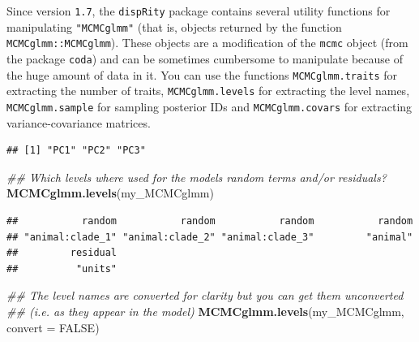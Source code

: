 \documentclass[
]{book}
\newenvironment{Shaded}{\begin{snugshade}}{\end{snugshade}}
\newcommand{\CommentTok}[1]{\textcolor[rgb]{0.56,0.35,0.01}{\textit{#1}}}
\newcommand{\DataTypeTok}[1]{\textcolor[rgb]{0.13,0.29,0.53}{#1}}
\newcommand{\KeywordTok}[1]{\textcolor[rgb]{0.13,0.29,0.53}{\textbf{#1}}}
\newcommand{\NormalTok}[1]{#1}
\newcommand{\OperatorTok}[1]{\textcolor[rgb]{0.81,0.36,0.00}{\textbf{#1}}}
\newcommand{\OtherTok}[1]{\textcolor[rgb]{0.56,0.35,0.01}{#1}}
\newcommand{\StringTok}[1]{\textcolor[rgb]{0.31,0.60,0.02}{#1}}
\begin{document}
Since version \texttt{1.7}, the \texttt{dispRity} package contains several utility functions for manipulating \texttt{"MCMCglmm"} (that is, objects returned by the function \texttt{MCMCglmm::MCMCglmm}).
These objects are a modification of the \texttt{mcmc} object (from the package \texttt{coda}) and can be sometimes cumbersome to manipulate because of the huge amount of data in it.
You can use the functions \texttt{MCMCglmm.traits} for extracting the number of traits, \texttt{MCMCglmm.levels} for extracting the level names, \texttt{MCMCglmm.sample} for sampling posterior IDs and \texttt{MCMCglmm.covars} for extracting variance-covariance matrices.

\begin{Shaded}
\end{Shaded}

\begin{verbatim}
## [1] "PC1" "PC2" "PC3"
\end{verbatim}

\begin{Shaded}
\begin{Highlighting}[]
\CommentTok{\#\# Which levels where used for the model\textquotesingle{}s random terms and/or residuals?}
\KeywordTok{MCMCglmm.levels}\NormalTok{(my\_MCMCglmm)}
\end{Highlighting}
\end{Shaded}

\begin{verbatim}
##           random           random           random           random 
## "animal:clade_1" "animal:clade_2" "animal:clade_3"         "animal" 
##         residual 
##          "units"
\end{verbatim}

\begin{Shaded}
\begin{Highlighting}[]
\CommentTok{\#\# The level names are converted for clarity but you can get them unconverted}
\CommentTok{\#\# (i.e. as they appear in the model)}
\KeywordTok{MCMCglmm.levels}\NormalTok{(my\_MCMCglmm, }\DataTypeTok{convert =} \OtherTok{FALSE}\NormalTok{)}
\end{Highlighting}
\end{Shaded}
\end{document}
